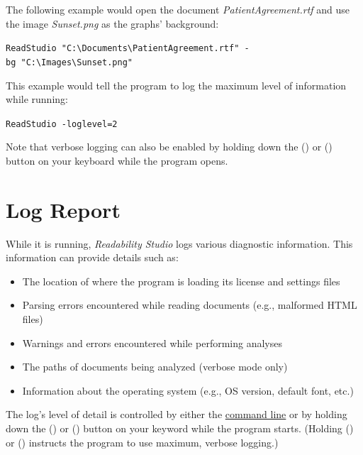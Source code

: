 \documentclass[
]{book}
\providecommand{\tightlist}{%
  \setlength{\itemsep}{0pt}\setlength{\parskip}{0pt}}
\newenvironment{darkmode}
  {
  \begin{mdframed}[backgroundcolor=black]
  \color{white}
  }
  {
  \end{mdframed}
  }
\theoremstyle{definition}
\theoremstyle{definition}
\theoremstyle{definition}
\theoremstyle{definition}
\theoremstyle{remark}
\begin{document}
The following example would open the document \emph{PatientAgreement.rtf} and use the image \emph{Sunset.png} as the graphs' background:

\begin{darkmode}
\texttt{ReadStudio\ "C:\textbackslash{}Documents\textbackslash{}PatientAgreement.rtf"\ -bg\ "C:\textbackslash{}Images\textbackslash{}Sunset.png"}

\end{darkmode}

This example would tell the program to log the maximum level of information while running:

\begin{darkmode}
\texttt{ReadStudio\ -loglevel=2}

\end{darkmode}

Note that verbose logging can also be enabled by holding down the  (\faWindows) or \keys{\shift} (\faApple) button on your keyboard while the program opens.

\hypertarget{log-report}{%
\section{Log Report}\label{log-report}}

While it is running, \emph{Readability Studio} logs various diagnostic information. This information can provide details such as:

\begin{itemize}
\tightlist
\item
  The location of where the program is loading its license and settings files
\item
  Parsing errors encountered while reading documents (e.g., malformed HTML files)
\item
  Warnings and errors encountered while performing analyses
\item
  The paths of documents being analyzed (verbose mode only)
\item
  Information about the operating system (e.g., OS version, default font, etc.)
\end{itemize}

The log's level of detail is controlled by either the \protect\hyperlink{command-line-options}{command line} or by holding down the  (\faWindows) or \keys{\shift} (\faApple) button on your keyword while the program starts. (Holding  (\faWindows) or \keys{\shift} (\faApple) instructs the program to use maximum, verbose logging.)
\end{document}
